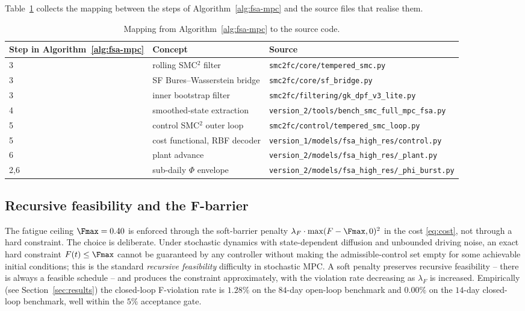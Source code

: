 \medskip
\noindent
Table~\ref{tab:mpc-files} collects the mapping between the steps of
Algorithm~\ref{alg:fsa-mpc} and the source files that realise them.

\begin{table}[h]
\centering
\small
\begin{tabular}{@{}lll@{}}
\toprule
Step in Algorithm~\ref{alg:fsa-mpc} & Concept & Source \\
\midrule
3 & rolling SMC${}^2$ filter      & \texttt{smc2fc/core/tempered\_smc.py} \\
3 & SF Bures--Wasserstein bridge   & \texttt{smc2fc/core/sf\_bridge.py} \\
3 & inner bootstrap filter         & \texttt{smc2fc/filtering/gk\_dpf\_v3\_lite.py} \\
4 & smoothed-state extraction      & \texttt{version\_2/tools/bench\_smc\_full\_mpc\_fsa.py} \\
5 & control SMC${}^2$ outer loop   & \texttt{smc2fc/control/tempered\_smc\_loop.py} \\
5 & cost functional, RBF decoder   & \texttt{version\_1/models/fsa\_high\_res/control.py} \\
6 & plant advance                   & \texttt{version\_2/models/fsa\_high\_res/\_plant.py} \\
2,6 & sub-daily $\Phi$ envelope    & \texttt{version\_2/models/fsa\_high\_res/\_phi\_burst.py} \\
\bottomrule
\end{tabular}
\caption{Mapping from Algorithm~\ref{alg:fsa-mpc} to the source code.}
\label{tab:mpc-files}
\end{table}

\subsection{Recursive feasibility and the F-barrier}\label{sec:mpc-feasibility}

The fatigue ceiling $\Fmax = 0.40$ is enforced through the soft-barrier
penalty $\lambda_F \cdot \max(F-\Fmax,0)^2$ in the cost
\eqref{eq:cost}, not through a hard constraint. The choice is
deliberate. Under stochastic dynamics with state-dependent diffusion and
unbounded driving noise, an exact hard constraint $F(t) \le \Fmax$ cannot
be guaranteed by any controller without making the admissible-control
set empty for some achievable initial conditions; this is the standard
\emph{recursive feasibility} difficulty in stochastic MPC. A soft
penalty preserves recursive feasibility -- there is always a feasible
schedule -- and produces the constraint approximately, with the violation
rate decreasing as $\lambda_F$ is increased. Empirically (see
Section~\ref{sec:results}) the closed-loop F-violation rate is
$1.28\%$ on the $84$-day open-loop benchmark and $0.00\%$ on the
$14$-day closed-loop benchmark, well within the $5\%$ acceptance gate.

